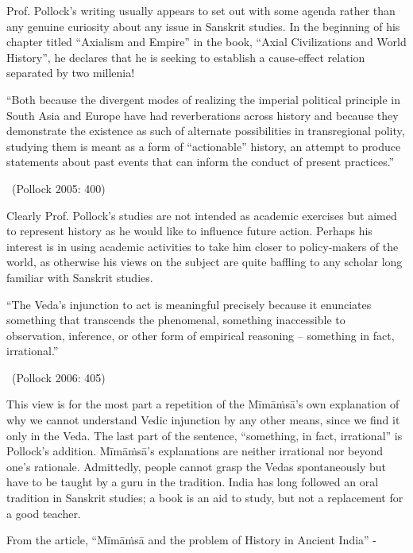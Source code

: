 Prof. Pollock’s writing usually appears to set out with some agenda rather than any genuine curiosity about any issue in Sanskrit studies. In the beginning of his chapter titled “Axialism and Empire” in the book, “Axial Civilizations and World History”, he declares that he is seeking to establish a cause-effect relation separated by two millenia!

\begin{myquote}
“Both because the divergent modes of realizing the imperial political principle in South Asia and Europe have had reverberations across history and because they demonstrate the existence as such of alternate possibilities in transregional polity, studying them is meant as a form of “actionable” history, an attempt to produce statements about past events that can inform the conduct of present practices.” 

~\hfill (Pollock 2005: 400)
\end{myquote}

Clearly Prof. Pollock’s studies are not intended as academic exercises but aimed to represent history as he would like to influence future action. Perhaps his interest is in using academic activities to take him closer to policy-makers of the world, as otherwise his views on the subject are quite baffling to any scholar long familiar with Sanskrit studies.

\begin{myquote}
“The Veda’s injunction to act is meaningful precisely because it enunciates something that transcends the phenomenal, something inaccessible to observation, inference, or other form of empirical reasoning -- something in fact, irrational.” 

~\hfill (Pollock 2006: 405)
\end{myquote}

This view is for the most part a repetition of the Mīmāṁsā’s own explanation of why we cannot understand Vedic injunction by any other means, since we find it only in the Veda. The last part of the sentence, “something, in fact, irrational” is Pollock’s addition. Mīmāṁsā’s explanations are neither irrational nor beyond one’s rationale. Admittedly, people cannot grasp the Vedas spontaneously but have to be taught by a guru in the tradition. India has long followed an oral tradition in Sanskrit studies; a book is an aid to study, but not a replacement for a good teacher. 

From the article, “Mīmāṁsā and the problem of History in Ancient India” -

